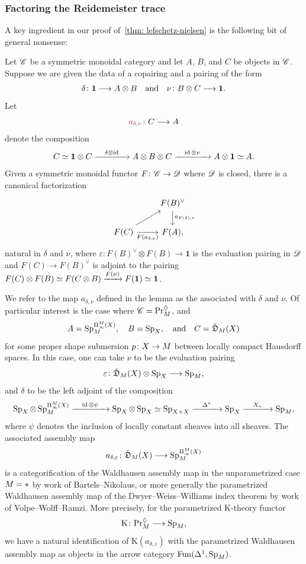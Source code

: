 \subsubsection{Factoring the Reidemeister trace}\label{subsec:factoring-reidemeister}
A key ingredient in our proof of~\cref{thm: lefschetz-nielsen} is the following bit of general nonsense:
\begin{lem}\label{lem: bartels-nikolaus nonsense}
  Let $\mathscr{C} $ be a symmetric monoidal category and let $A$, $B$, and $C$ be objects in $\mathscr{C}$. Suppose we are given the data of a copairing and a pairing of the form
  \[
    \delta\colon\mathbf 1\longrightarrow A\otimes B\quad\text{and}\quad
    \nu\colon B\otimes C\longrightarrow\mathbf 1.
  \]
  Let
  \[
    \mdef{a_{\delta ,\nu}}\colon C\too A
  \]
  denote the composition
  \[
    C\simeq \mathbf 1\otimes C\xrightarrow{\quad \delta\otimes\operatorname{id}\quad} A\otimes B\otimes C\xrightarrow{\quad \operatorname{id}\otimes\nu\quad}A\otimes\mathbf 1\simeq A.
  \]
  Given a symmetric monoidal functor $F\colon\mathscr{C}\to\mathscr{D}$ where $\mathscr{D}$ is closed, there is a canonical factorization
  \[\begin{tikzcd}
      &  F(B)^\vee\\
      F(C) & {F(A)},
      \arrow["{a_{F(\delta ),\varepsilon }}", from=1-2, to=2-2]
      \arrow[from=2-1, to=1-2]
      \arrow["{F(a_{\delta ,\nu})}"', from=2-1, to=2-2]
    \end{tikzcd}\]
  natural in $\delta$ and $\nu$,
  where $\varepsilon\colon F(B)^\vee\otimes F(B)\to\mathbf 1$ is the evaluation pairing in $\mathscr{D}$ and $F(C)\to F(B)^\vee$ is adjoint to the pairing $F(C)\otimes F(B)\simeq F(C\otimes B)\xrightarrow{F(\nu )} F(\mathbf 1)\simeq\mathbf 1$.
\end{lem}
We refer to the map $a_{\delta ,\nu}$ defined in the lemma as the  associated with $\delta$ and $\nu$. Of particular interest is the case where $\mathscr{C} = \mathrm{Pr}_{M}^{\lozenge}$, and \[A = \Sp_\base^{\ani{\tset}[\base]}, \quad B = \D{\tset},\quad \text{and} \quad C = \pcoShat{\base}{\tset}\] for some proper shape submersion $p\colon X\to M$ between locally compact Hausdorff spaces. In this case, one can take $\nu$ to be the evaluation pairing \[\varepsilon\colon\check{\mathfrak{D}}_{M}(X)\otimes\operatorname{Sp}_{X}\longrightarrow\operatorname{Sp}_M,\] and $\delta$ to be the left adjoint of the composition
\[
  \D\tset\otimes\Sp_\base^{\ani{\tset}[\base]}\xtoo{\id\otimes\psi}\D\tset\otimes\D\tset\simeq\D{\tset\times\tset}\xtoo{\Delta^*}\D\tset\xtoo{X_*}\Sp_\base,
\]
where $\psi$ denotes the inclusion of locally constant sheaves into all sheaves. The associated assembly map
\[
  a_{\delta ,\varepsilon}\colon\pcoShat\base\tset\too\Sp_\base^{\ani{\tset}[\base]}
\]
is a categorification of the Waldhausen assembly map in the unparametrized case $M=\ast$ by work of Bartels--Nikolaus, or more generally the parametrized Waldhausen assembly map of the Dwyer--Weiss--Williams index theorem by work of Volpe--Wolff--Ramzi. More precisely, for the parametrized K-theory functor \[\mathrm K\colon\mathrm{Pr}_{M}^{\lozenge}\longrightarrow\operatorname{Sp}_M,\] we have a natural identification of $\mathrm K(a_{\delta ,\varepsilon })$ with the parametrized Waldhausen assembly map as objects in the arrow category $\operatorname{Fun} (\Delta^1,\operatorname{Sp}_M )$.

